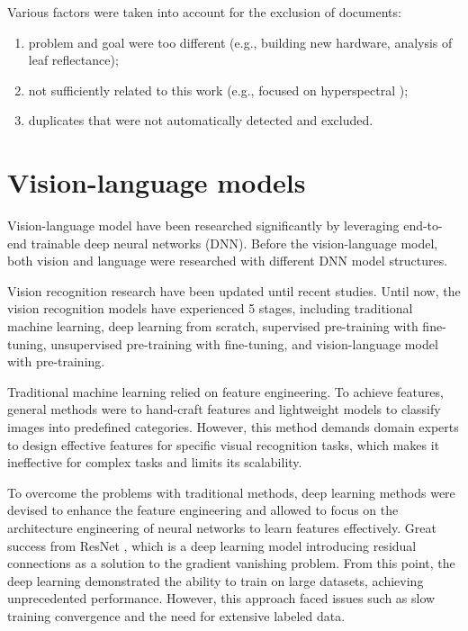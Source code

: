 Various factors were taken into account for the exclusion of documents:
\begin{enumerate}
    \item problem and goal were too different (e.g., building new hardware, analysis of leaf reflectance);
    \item not sufficiently related to this work (e.g., focused on hyperspectral );
    \item duplicates that were not automatically detected and excluded.
\end{enumerate}


\section{Vision-language models}
Vision-language model have been researched significantly by leveraging end-to-end trainable deep neural networks (DNN). Before the vision-language model, both vision and language were researched with different DNN model structures. 

Vision recognition research have been updated until recent studies. Until now, the vision recognition models have experienced 5 stages, including traditional machine learning, deep learning from scratch, supervised pre-training with fine-tuning, unsupervised pre-training with fine-tuning, and vision-language model with pre-training.

Traditional machine learning relied on feature engineering. To achieve features, general methods were to hand-craft features \cite{svmclassification} and lightweight models \cite{knn}\cite{svm} to classify images into predefined categories. However, this method demands domain experts to design effective features for specific visual recognition tasks, which makes it ineffective for complex tasks and limits its scalability.

To overcome the problems with traditional methods, deep learning methods were devised \cite{imagenet} \cite{dnn_imagerecognition} to enhance the feature engineering and allowed to focus on the architecture engineering of neural networks to learn features effectively.
Great success from ResNet \cite{resnet}, which is a deep learning model introducing residual connections as a solution to the gradient vanishing problem. From this point, the deep learning demonstrated the ability to train on large datasets, achieving unprecedented performance. However, this approach faced issues such as slow training convergence and the need for extensive labeled data. 

